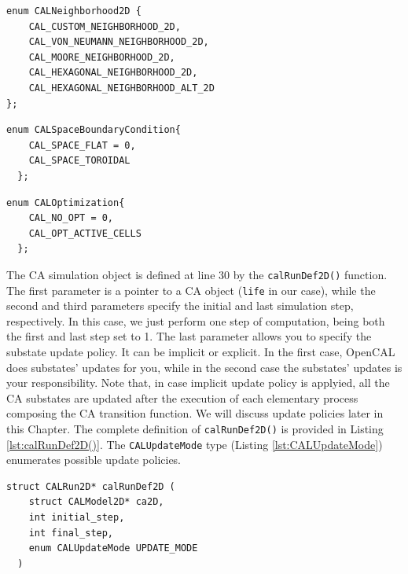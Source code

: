 \begin{lstlisting}[float,floatplacement=H, label=lst:CALNeighborhood2D, caption=The CALNeighborhood2D enum type., numbers=none]
  enum CALNeighborhood2D { 
    CAL_CUSTOM_NEIGHBORHOOD_2D,
    CAL_VON_NEUMANN_NEIGHBORHOOD_2D,
    CAL_MOORE_NEIGHBORHOOD_2D,
    CAL_HEXAGONAL_NEIGHBORHOOD_2D,
    CAL_HEXAGONAL_NEIGHBORHOOD_ALT_2D 
};
\end{lstlisting}  

\begin{lstlisting}[float,floatplacement=H, label=lst:CALSpaceBoundaryCondition, caption=The CALSpaceBoundaryCondition enum type., numbers=none]
  enum CALSpaceBoundaryCondition{
    CAL_SPACE_FLAT = 0,         
    CAL_SPACE_TOROIDAL
  };
\end{lstlisting}

\begin{lstlisting}[float,floatplacement=H, label=lst:CALOptimization, caption=The CALOptimization enum type., numbers=none]
  enum CALOptimization{
    CAL_NO_OPT = 0,
    CAL_OPT_ACTIVE_CELLS        
  };
\end{lstlisting}

The CA simulation object is defined at line 30 by the
\verb'calRunDef2D()' function. The first parameter is a pointer to a
CA object (\verb'life' in our case), while the second and third
parameters specify the initial and last simulation step,
respectively. In this case, we just perform one step of computation,
being both the first and last step set to 1. The last parameter allows
you to specify the substate update policy. It can be implicit or
explicit. In the first case, OpenCAL does substates' updates for you,
while in the second case the substates' updates is your
responsibility. Note that, in case implicit update policy is applyied,
all the CA substates are updated after the execution of each
elementary process composing the CA transition function. We will
discuss update policies later in this Chapter. The complete definition
of \verb'calRunDef2D()' is provided in Listing
\ref{lst:calRunDef2D()}. The \verb'CALUpdateMode' type (Listing
\ref{lst:CALUpdateMode}) enumerates possible update policies.

\begin{lstlisting}[float,floatplacement=H, label=lst:calRunDef2D(), caption=Definition of the calRunDef2D() function., numbers=none]
  struct CALRun2D* calRunDef2D (
    struct CALModel2D* ca2D,
    int initial_step,
    int final_step,
    enum CALUpdateMode UPDATE_MODE 
  )	
\end{lstlisting}

